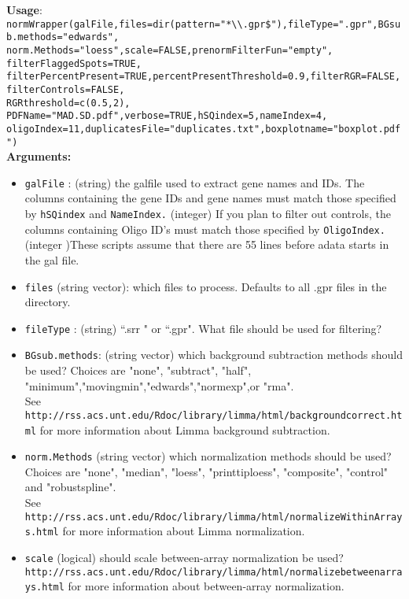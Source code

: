 \documentclass[10pt]{article}
\newcommand{\fquote}{``}
\begin{document}
    \textbf{Usage}:\\
\texttt{normWrapper(galFile,files=dir(pattern="*\textbackslash\textbackslash.gpr\$"),fileType=".gpr",BGsub.methods="edwards",\\ \indent norm.Methods="loess",scale=FALSE,prenormFilterFun="empty",
                      filterFlaggedSpots=TRUE,\\ \indent filterPercentPresent=TRUE,percentPresentThreshold=0.9,filterRGR=FALSE,filterControls=FALSE,\\ \indent RGRthreshold=c(0.5,2),
                      PDFName="MAD.SD.pdf",verbose=TRUE,hSQindex=5,nameIndex=4,\\ \indent oligoIndex=11,duplicatesFile="duplicates.txt",boxplotname="boxplot.pdf")}\\
     \textbf{Arguments:}
     \begin{itemize}
       \item \texttt{galFile} : (string) the galfile used to extract gene names and IDs. The columns containing the gene IDs and gene names must match those specified by \texttt{hSQindex} and \texttt{NameIndex.} (integer) If you plan to filter out controls, the columns containing Oligo ID's must match those specified by \texttt{OligoIndex.}  (integer )These scripts assume that there are 55 lines before adata starts in the gal file. 
	\item \texttt{files} (string vector): which files to process. Defaults to all .gpr files in the directory.
    	\item \texttt{fileType} : (string) \fquote .srr " or \fquote .gpr". What file should be used for filtering?
     	\item \texttt{BGsub.methods}: (string vector) which background subtraction methods should be used? Choices are "none", "subtract", "half", "minimum","movingmin","edwards","normexp",or "rma".\\ See \texttt{http://rss.acs.unt.edu/Rdoc/library/limma/html/backgroundcorrect.html} for more information about Limma background subtraction.
     	\item \texttt{norm.Methods} (string vector) which normalization methods should be used? Choices are "none", "median", "loess", "printtiploess", "composite", "control" and "robustspline".  \\See \texttt{http://rss.acs.unt.edu/Rdoc/library/limma/html/normalizeWithinArrays.html} for more information about Limma normalization.
     	\item \texttt{scale} (logical) should scale between-array normalization be used? \\ \texttt{http://rss.acs.unt.edu/Rdoc/library/limma/html/normalizebetweenarrays.html} for more information about between-array normalization. 

\end{itemize}
\end{document}
